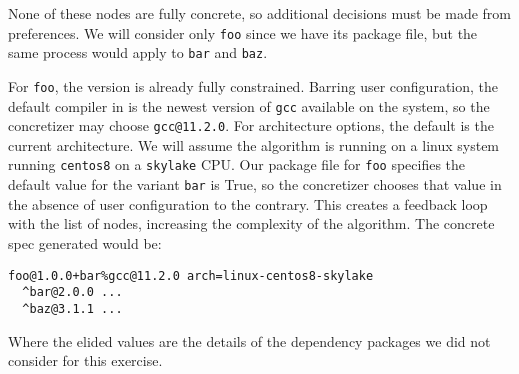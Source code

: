 None of these nodes are fully concrete, so additional decisions must be made from preferences.
We will consider only \texttt{foo} since we have its package file, but the same process would apply to \texttt{bar} and \texttt{baz}.

For \texttt{foo}, the version is already fully constrained.
Barring user configuration, the default compiler in \spack{} is the newest version of \texttt{gcc} available on the system, so the concretizer may choose \texttt{gcc@11.2.0}.
For architecture options, the default is the current architecture. We will assume the algorithm is running on a linux system running \texttt{centos8} on a \texttt{skylake} CPU.
Our package file for \texttt{foo} specifies the default value for the variant \texttt{bar} is True, so the concretizer chooses that value in the absence of user configuration to the contrary.
This creates a feedback loop with the list of nodes, increasing the complexity of the algorithm.
The concrete spec generated would be:

\begin{verbatim}
foo@1.0.0+bar%gcc@11.2.0 arch=linux-centos8-skylake
  ^bar@2.0.0 ...
  ^baz@3.1.1 ...
\end{verbatim}

Where the elided values are the details of the dependency packages we did not consider for this exercise.
